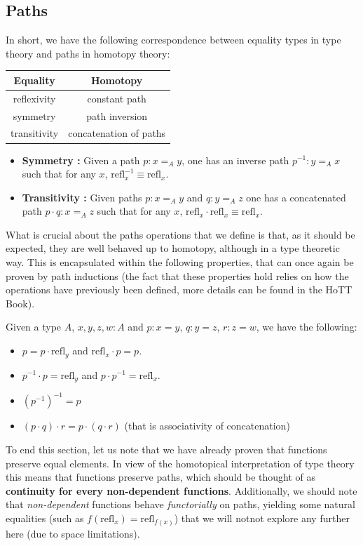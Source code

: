 \documentclass{report}
\begin{document}
\subsection{Paths}
In short, we have the following correspondence between equality types in type theory and paths in homotopy theory:
\begin{center}
\begin{tabular}{|c|c|}
  \hline Equality & Homotopy \\
  \hline reflexivity & constant path \\
  \hline symmetry  & path inversion \\
  \hline transitivity & concatenation of paths \\
  \hline
\end{tabular}
\end{center}
\begin{itemize}
  \item \textbf{Symmetry : } Given a path $p : x =_A y$, one has an inverse path $p^{-1} : y =_A x$ such that for any $x$, $\mathrm{refl}_x^{-1} \equiv \mathrm{refl}_x$.
  \item \textbf{Transitivity : } Given paths $p : x =_A y$ and $q : y =_A z$ one has a concatenated path $p \cdot q : x =_A z$ such that for any $x$, $\mathrm{refl}_x \cdot \mathrm{refl}_x \equiv \mathrm{refl}_x$.
\end{itemize}


What is crucial about the paths operations that we define is that, as it should be expected, they are well behaved up to homotopy, although in a type theoretic way. This is encapsulated within the following properties, that can once again be proven by path inductions (the fact that these properties hold relies on how the operations have previously been defined, more details can be found in the HoTT Book\cite{hott}).
\begin{prop}
  Given a type $A$, $x,y,z,w : A$ and $p : x=y$, $q : y=z$, $r : z=w$, we have the following:
  \begin{itemize}
    \item $p = p \cdot \mathrm{refl}_y$ and $ \mathrm{refl}_x \cdot p = p$. 
    \item $p^{-1} \cdot p = \mathrm{refl}_y$ and $p \cdot p^{-1} = \mathrm{refl}_x$.
    \item $(p^{-1})^{-1} = p$
    \item $(p \cdot q) \cdot r = p \cdot (q \cdot r)$ (that is associativity of concatenation)
  \end{itemize}
\end{prop}
To end this section, let us note that we have already proven that functions preserve equal elements. In view of the homotopical interpretation of type theory this means that functions preserve paths, which should be thought of as \textbf{continuity for every non-dependent functions}. Additionally, we should note that \emph{non-dependent} functions behave \textit{functorially} on paths, yielding some natural equalities (such as $f(\mathrm{refl}_x)=\mathrm{refl}_{f(x)}$) that we will notnot explore any further here (due to space limitations).
\end{document}
